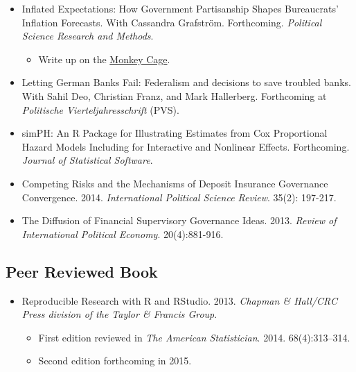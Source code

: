 \documentclass[a4paper]{article}
\begin{document}
{{\begin{itemize}
    \item Inflated Expectations: How Government Partisanship Shapes Bureaucrats' Inflation Forecasts. With Cassandra Grafstr\"{o}m. Forthcoming. {\emph{Political Science Research and Methods}}.

    \begin{itemize}
        \item Write up on the \href{http://www.washingtonpost.com/blogs/monkey-cage/wp/2015/01/28/the-fed-cant-accurately-forecast-inflation-heres-why-this-may-hurt-democrats/}{Monkey Cage}.
    \end{itemize}

    \item Letting German Banks Fail: Federalism and decisions to save troubled banks. With Sahil Deo, Christian Franz, and Mark Hallerberg. Forthcoming at \emph{Politische Vierteljahresschrift} (PVS).

    \item simPH: An R Package for Illustrating Estimates from Cox Proportional Hazard Models Including for Interactive and Nonlinear Effects. Forthcoming. {\emph{Journal of Statistical Software}}.

    \item Competing Risks and the Mechanisms of Deposit Insurance Governance Convergence. 2014. {\emph{International Political Science Review}}. 35(2): 197-217.

    \item The Diffusion of Financial Supervisory Governance Ideas. 2013. {\emph{Review of International Political Economy}}. 20(4):881-916.

\end{itemize}

\subsection*{Peer Reviewed Book}

\begin{itemize}
    \item Reproducible Research with R and RStudio. 2013. {\emph{Chapman \& Hall/CRC Press division of the Taylor \& Francis Group}}.

        \begin{itemize}
            \item First edition reviewed in \emph{The American Statistician}. 2014. 68(4):313--314.
            \item Second edition forthcoming in 2015.
        \end{itemize}


\end{itemize}}}
\end{document}
